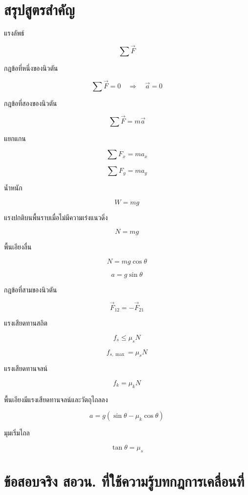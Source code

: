 \section{สรุปสูตรสำคัญ}

\begin{tcolorbox}[title=สรุปบทที่ 5: กฎการเคลื่อนที่]
แรงลัพธ์

\[
\sum \vec{F}
\]

กฎข้อที่หนึ่งของนิวตัน

\[
\sum \vec{F}=0
\quad \Rightarrow \quad
\vec{a}=0
\]

กฎข้อที่สองของนิวตัน

\[
\sum \vec{F}=m\vec{a}
\]

แยกแกน

\[
\sum F_x=ma_x
\]

\[
\sum F_y=ma_y
\]

น้ำหนัก

\[
W=mg
\]

แรงปกติบนพื้นราบเมื่อไม่มีความเร่งแนวดิ่ง

\[
N=mg
\]

พื้นเอียงลื่น

\[
N=mg\cos\theta
\]

\[
a=g\sin\theta
\]
\end{tcolorbox}

\begin{tcolorbox}[title=สรุปบทที่ 5: กฎการเคลื่อนที่ ต่อ]
กฎข้อที่สามของนิวตัน

\[
\vec{F}_{12}=-\vec{F}_{21}
\]

แรงเสียดทานสถิต

\[
f_s\leq \mu_sN
\]

\[
f_{s,\max}=\mu_sN
\]

แรงเสียดทานจลน์

\[
f_k=\mu_kN
\]

พื้นเอียงมีแรงเสียดทานจลน์และวัตถุไถลลง

\[
a=g(\sin\theta-\mu_k\cos\theta)
\]

มุมเริ่มไถล

\[
\tan\theta=\mu_s
\]
\end{tcolorbox}

\section{ข้อสอบจริง สอวน. ที่ใช้ความรู้บทกฎการเคลื่อนที่}

